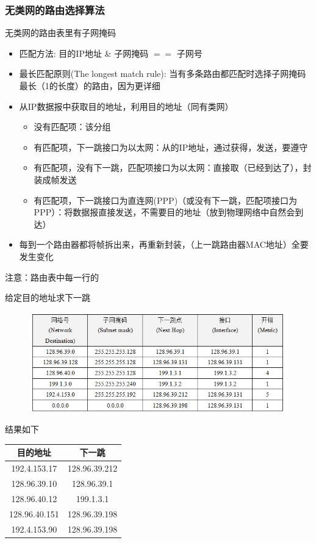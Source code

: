 \subsubsection{无类网的路由选择算法}
无类网的路由表里有子网掩码
\begin{itemize}
	\item 匹配方法: 目的IP地址 \& 子网掩码 $==$ 子网号
	\item 最长匹配原则(The longest match rule): 当有多条路由都匹配时选择子网掩码最长（1的长度）的路由，因为更详细
	\item 从IP数据报中获取目的地址，利用目的地址（同有类网）
	\begin{itemize}
		\item 没有匹配项：该分组
		\item 有匹配项，下一跳接口为以太网：从的IP地址，通过获得，发送，要遵守
		\item 有匹配项，没有下一跳，匹配项接口为以太网：直接取（已经到达了），封装成帧发送
		\item 有匹配项，下一跳接口为直连网(PPP)（或没有下一跳，匹配项接口为PPP）：将数据报直接发送，不需要目的地址（放到物理网络中自然会到达）
	\end{itemize}
	\item 每到一个路由器都将帧拆出来，再重新封装，（上一跳路由器MAC地址）全要发生变化
\end{itemize}
注意：路由表中每一行的

\begin{example}
	给定目的地址求下一跳
\begin{figure}[H]
	\centering
	\includegraphics[width=0.8\linewidth]{fig/router_table_example.jpg}
\end{figure}
\end{example}
\begin{analysis}
	结果如下
	\begin{center}
		\begin{tabular}{cc}\hline
			目的地址 & 下一跳\\\hline
			192.4.153.17 & 128.96.39.212\\
			128.96.39.10 & 128.96.39.1\\
			128.96.40.12 & 199.1.3.1\\
			128.96.40.151 & 128.96.39.198\\
			192.4.153.90 & 128.96.39.198\\\hline
		\end{tabular}
	\end{center}
\end{analysis}

